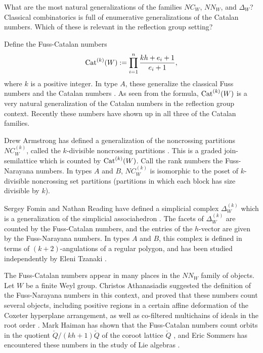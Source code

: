 \documentclass[12pt,letterpaper, reqno]{amsart}
\newcommand{\Cat}{{\rm Cat}}
\begin{document}
\begin{problemblock}

\begin{problem} 
\label{central:three}
What are the most natural generalizations of the families $NC_W$, $NN_W$, and $\Delta_W$? Classical combinatorics is full of enumerative generalizations of the Catalan numbers. Which of these is relevant in the reflection group setting?
\end{problem}

Define the {\sf Fuss-Catalan numbers}
\begin{equation*}
\Cat^{(k)}(W):= \prod_{i=1}^n \frac{kh+e_i+1}{e_i+1},
\end{equation*}
where $k$ is a positive integer. In type $A$, these generalize the classical Fuss numbers and the Catalan numbers \cite{fomin-reading,hilton-pederson}. As seen from the formula, $\Cat^{(k)}(W)$ is a very natural generalization of the Catalan numbers in the reflection group context. Recently these numbers  have shown up in all three of the Catalan families.

\begin{remark}
Drew Armstrong has defined a generalization of the noncrossing partitions $NC_W^{(k)}$, called the {\sf $k$-divisible noncrossing partitions} \cite{armstrong}. This is a graded join-semilattice which is counted by $\Cat^{(k)}(W)$. Call the rank numbers the {\sf Fuss-Narayana numbers}. In types $A$ and $B$, $NC_W^{(k)}$ is isomorphic to the poset of $k$-divisible noncrossing set partitions (partitions in which each block has size divisible by $k$).
\end{remark}

\begin{remark}
Sergey Fomin and Nathan Reading have defined a simplicial complex $\Delta^{(k)}_W$ which is a generalization of the simplicial associahedron \cite{fomin-reading}. The facets of $\Delta^{(k)}_W$ are counted by the Fuss-Catalan numbers, and the entries of the $h$-vector are given by the Fuss-Narayana numbers. In types $A$ and $B$, this complex is defined in terms of $(k+2)$-angulations of a regular polygon, and has been studied independently by Eleni Tzanaki \cite{tzanaki}.
\end{remark}

\begin{remark}
The Fuss-Catalan numbers appear in many places in the $NN_W$ family of objects. Let $W$ be a finite Weyl group. Christos Athanasiadis suggested the definition of the Fuss-Narayana numbers in this context, and proved that these numbers count several objects, including positive regions in a certain affine deformation of the Coxeter hyperplane arrangement, as well as co-filtered multichains of ideals in the root order \cite{athanasiadis:cat,athanasiadis:nar}. Mark Haiman has shown that the Fuss-Catalan numbers count orbits in the quotient $\check{Q}/(kh+1)\check{Q}$ of the coroot lattice $\check{Q}$ \cite{haiman:conjectures}, and Eric Sommers has encountered these numbers in the study of Lie algebras \cite{sommers}.
\end{remark}
\end{problemblock}
\end{document}
